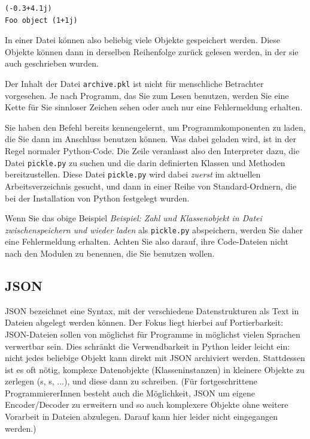 \begin{cmdbox}
\begin{verbatim}
(-0.3+4.1j)
Foo object (1+1j)
\end{verbatim}
\end{cmdbox}

In einer Datei können also beliebig viele Objekte gespeichert werden. Diese Objekte können dann in derselben Reihenfolge zurück gelesen werden, in der sie auch geschrieben wurden.

Der Inhalt der Datei \texttt{archive.pkl} ist nicht für menschliche Betrachter vorgesehen. Je nach Programm, das Sie zum Lesen benutzen, werden Sie eine Kette für Sie sinnloser Zeichen sehen oder auch nur eine Fehlermeldung erhalten.

\begin{hintbox}
Sie haben den Befehl  bereits kennengelernt, um Programmkomponenten zu laden, die Sie dann im Anschluss benutzen können. Was dabei geladen wird, ist in der Regel normaler Python-Code. Die Zeile  veranlasst also den Interpreter dazu, die Datei \texttt{pickle.py} zu suchen und die darin definierten Klassen und Methoden bereitzustellen. Diese Datei \texttt{pickle.py} wird dabei \emph{zuerst} im aktuellen Arbeitsverzeichnis gesucht, und dann in einer Reihe von Standard-Ordnern, die bei der Installation von Python festgelegt wurden.

Wenn Sie das obige Beispiel \emph{Beispiel: Zahl und Klassenobjekt in Datei zwischenspeichern und wieder laden} als \texttt{pickle.py} abspeichern, werden Sie daher eine Fehlermeldung erhalten. Achten Sie also darauf, ihre Code-Dateien nicht nach den Modulen zu benennen, die Sie benutzen wollen.
\end{hintbox}

\subsection{JSON}
JSON bezeichnet eine Syntax, mit der verschiedene Datenstrukturen als Text in Dateien abgelegt werden können. Der Fokus liegt hierbei auf Portierbarkeit: JSON-Dateien sollen von möglichst für Programme in möglichst vielen Sprachen verwertbar sein. Dies schränkt die Verwendbarkeit in Python leider leicht ein: nicht jedes beliebige Objekt kann direkt mit JSON archiviert werden. Stattdessen ist es oft nötig, komplexe Datenobjekte (Klasseninstanzen) in kleinere Objekte zu zerlegen (s, s, ...), und diese dann zu schreiben. (Für fortgeschrittene ProgrammiererInnen besteht auch die Möglichkeit, JSON um eigene Encoder/Decoder zu erweitern und so auch komplexere Objekte ohne weitere Vorarbeit in Dateien abzulegen. Darauf kann hier leider nicht eingegangen werden.)

